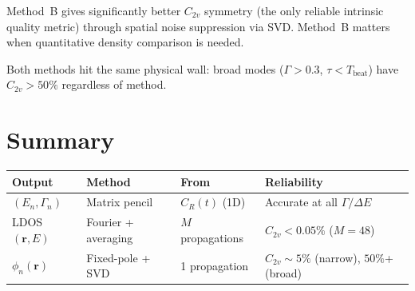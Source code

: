 \documentclass[11pt,a4paper]{article}
\newcommand{\vb}[1]{\mathbf{#1}}
\begin{document}
Method~B gives significantly better $C_{2v}$ symmetry
(the only reliable intrinsic quality metric) through spatial noise
suppression via SVD. Method~B matters when quantitative density comparison is needed.

Both methods hit the same physical wall: broad modes
($\Gamma > 0.3$, $\tau < T_\text{beat}$) have $C_{2v} > 50\%$
regardless of method.

\section*{Summary}

\begin{center}
\begin{tabular}{llll}
\toprule
Output & Method & From & Reliability \\
\midrule
$(E_n, \Gamma_n)$ & Matrix pencil & $C_R(t)$ (1D) &
  Accurate at all $\Gamma/\Delta E$ \\
LDOS$(\vb{r}, E)$ & Fourier + averaging &
  $M$ propagations & $C_{2v} < 0.05\%$ ($M = 48$) \\
$\phi_n(\vb{r})$ & Fixed-pole + SVD &
  1 propagation & $C_{2v} \sim 5\%$ (narrow), $50\%$+ (broad) \\
\bottomrule
\end{tabular}
\end{center}
\end{document}
